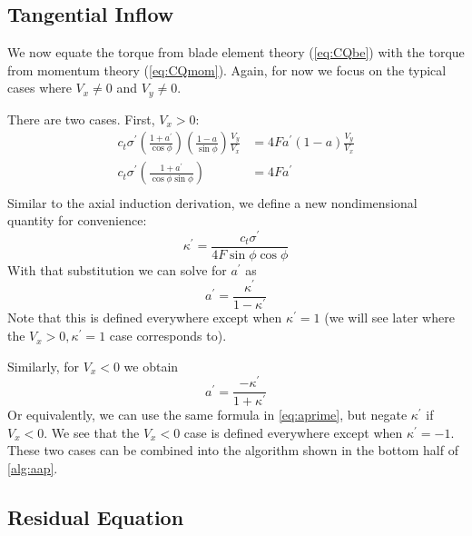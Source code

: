 \documentclass{article}
\begin{document}
\subsection{Tangential Inflow}

We now equate the torque from blade element theory (\cref{eq:CQbe}) with the torque from momentum theory (\cref{eq:CQmom}).  Again, for now we focus on the typical cases where $V_x \ne 0$ and $V_y \ne 0$.

There are two cases.  First, $V_x > 0$:
\begin{equation}
\begin{aligned}
 c_t \sigma^\prime \left(\frac{1 + a^\prime}{\cos\phi}\right)\left(\frac{1 - a}{\sin\phi}\right)\frac{V_y}{V_x} &= 4 F a^\prime (1 - a) \frac{V_y}{V_x}\\
 c_t \sigma^\prime \left(\frac{1 + a^\prime}{\cos\phi\sin\phi}\right)&= 4 F a^\prime \\
\end{aligned}
\end{equation}
Similar to the axial induction derivation, we define a new nondimensional quantity for convenience:
\begin{equation}
    \kappa^\prime = \frac{c_t \sigma^\prime}{4 F \sin\phi \cos\phi}
\end{equation}
With that substitution we can solve for $a^\prime$ as
\begin{equation}
    a^\prime = \frac{\kappa^\prime}{1 - \kappa^\prime}
    \label{eq:aprime}
\end{equation}
Note that this is defined everywhere except when $\kappa^\prime = 1$ (we will see later where the $V_x > 0, \kappa^\prime = 1$ case corresponds to).

Similarly, for $V_x < 0$ we obtain
\begin{equation}
    a^\prime = \frac{-\kappa^\prime}{1 + \kappa^\prime}
\end{equation}
Or equivalently, we can use the same formula in \cref{eq:aprime}, but negate $\kappa^\prime$ if $V_x < 0$.  We see that the $V_x < 0$ case is defined everywhere except when $\kappa^\prime = -1$.  These two cases can be combined into the algorithm shown in the bottom half of \cref{alg:aap}.





\subsection{Residual Equation}
\end{document}
